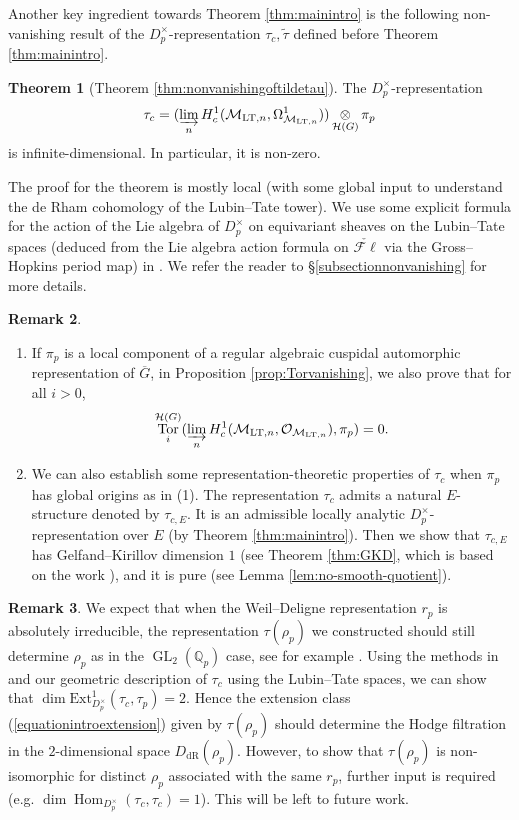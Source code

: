 \documentclass{article}
\theoremstyle{definition}
\newtheorem{theorem}{Theorem}[section]
\newtheorem{remark}[theorem]{Remark}
\def\calH{\mathcal{H}}
\def\calM{\mathcal{M}}
\def\calO{\mathcal{O}}
\def\bbQ{\mathbb{Q}}
\DeclareMathOperator{\ox}{\otimes}
\newcommand{\dlim}{\varinjlim}
\DeclareMathOperator{\Hom}{Hom}
\DeclareMathOperator{\Tor}{Tor}
\DeclareMathOperator{\GL}{GL}
\DeclareMathOperator{\dR}{dR}
\def\LT{\mathrm{LT}}
\def\bar{\overline}
\def\fl{\mathscr{F}\ell}
\begin{document}
Another key ingredient towards Theorem \ref{thm:mainintro} is the following non-vanishing result of the $D_p^{\times}$-representation $\tau_c,\widetilde{\tau}$ defined before Theorem \ref{thm:mainintro}. 
\begin{theorem}[Theorem \ref{thm:nonvanishingoftildetau}]\label{thmintornonvanishing}
    The $D_p^{\times}$-representation 
    \[\tau_c=(\dlim_n H^1_c(\calM_{\LT,n},\Omega_{\calM_{\LT,n}}^1))\ox_{\calH(G)}\pi_p\] 
    is infinite-dimensional. In particular, it is non-zero.
\end{theorem}
The proof for the theorem is mostly local (with some global input to understand the de Rham cohomology of the Lubin--Tate tower). We use some explicit formula for the action of the Lie algebra of $D_p^{\times}$ on equivariant sheaves on the Lubin--Tate spaces (deduced from the Lie algebra action formula on $\check{\fl}$ via the Gross--Hopkins period map) in \cite[\S 25]{GH94}. We refer the reader to \S\ref{subsectionnonvanishing} for more details. 
\begin{remark}
    \begin{enumerate}[(1)]
        \item If $\pi_p$ is a local component of a regular algebraic cuspidal automorphic representation of $\bar G$, in Proposition \ref{prop:Torvanishing}, we also prove that for all $i>0$, 
        \[\Tor_i^{\calH(G)}(\dlim_nH^1_c(\calM_{\LT,n},\calO_{\calM_{\LT,n}}),\pi_p)=0.\]
        \item We can also establish some representation-theoretic properties of $\tau_c$ when $\pi_p$ has global origins as in (1). The representation $\tau_c$ admits a natural $E$-structure denoted by $\tau_{c,E}$. It is an admissible locally analytic $D_p^\times$-representation over $E$ (by Theorem \ref{thm:mainintro}). Then we show that $\tau_{c,E}$ has Gelfand--Kirillov dimension $1$ (see Theorem \ref{thm:GKD}, which is based on the work \cite{dospinescu2023gelfand}), and it is pure (see Lemma \ref{lem:no-smooth-quotient}).
    \end{enumerate}  
\end{remark}
\begin{remark}
    We expect that when the Weil--Deligne representation $r_p$ is absolutely irreducible, the representation $\tau(\rho_p)$ we constructed should still determine $\rho_p$ as in the $\GL_2(\bbQ_p)$ case, see for example \cite{Din22}. Using the methods in \cite{QS24,su2025locallyanalytictextext1conjecturetextgl2l} and our geometric description of $\tau_{c}$ using the Lubin--Tate spaces, we can show that $\dim \mathrm{Ext}^1_{D_p^{\times}}(\tau_c,\tau_p)=2$. Hence the extension class (\ref{equationintroextension}) given by $\tau(\rho_p)$ should determine the Hodge filtration in the $2$-dimensional space $D_{\dR}(\rho_p)$. However, to show that $\tau(\rho_p)$ is non-isomorphic for distinct $\rho_p$ associated with the same $r_p$, further input is required (e.g. $\dim \Hom_{D_p^{\times}}(\tau_c,\tau_c)=1$). This will be left to future work.
\end{remark}
\end{document}
